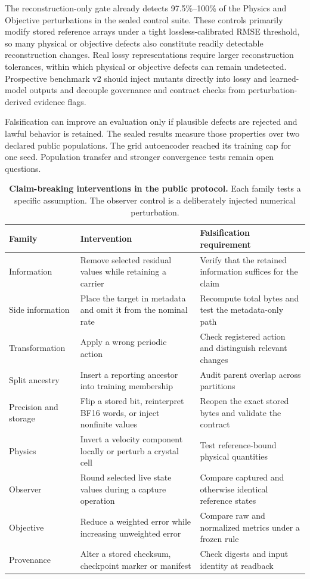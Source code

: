 \documentclass[10pt,a4paper,twocolumn]{article}
\begin{document}
The reconstruction-only gate already detects 97.5\%--100\% of the Physics and Objective perturbations in the sealed control suite. These controls primarily modify stored reference arrays under a tight lossless-calibrated RMSE threshold, so many physical or objective defects also constitute readily detectable reconstruction changes. Real lossy representations require larger reconstruction tolerances, within which physical or objective defects can remain undetected. Prospective benchmark v2 should inject mutants directly into lossy and learned-model outputs and decouple governance and contract checks from perturbation-derived evidence flags.

Falsification can improve an evaluation only if plausible defects are rejected and lawful behavior is retained. The sealed results measure those properties over two declared public populations. The grid autoencoder reached its training cap for one seed. Population transfer and stronger convergence tests remain open questions.

\begin{table}[t]
\caption{\textbf{Claim-breaking interventions in the public protocol.} Each family tests a specific assumption. The observer control is a deliberately injected numerical perturbation.}
\label{tab:mutants}
\small
\begin{tabularx}{\textwidth}{@{}P{0.16\textwidth}YY@{}}
\toprule
Family & Intervention & Falsification requirement\\
\midrule
Information & Remove selected residual values while retaining a carrier & Verify that the retained information suffices for the claim\\
Side information & Place the target in metadata and omit it from the nominal rate & Recompute total bytes and test the metadata-only path\\
Transformation & Apply a wrong periodic action & Check registered action and distinguish relevant changes\\
Split ancestry & Insert a reporting ancestor into training membership & Audit parent overlap across partitions\\
Precision and storage & Flip a stored bit, reinterpret BF16 words, or inject nonfinite values & Reopen the exact stored bytes and validate the contract\\
Physics & Invert a velocity component locally or perturb a crystal cell & Test reference-bound physical quantities\\
Observer & Round selected live state values during a capture operation & Compare captured and otherwise identical reference states\\
Objective & Reduce a weighted error while increasing unweighted error & Compare raw and normalized metrics under a frozen rule\\
Provenance & Alter a stored checksum, checkpoint marker or manifest & Check digests and input identity at readback\\
\bottomrule
\end{tabularx}
\end{table}
\end{document}
